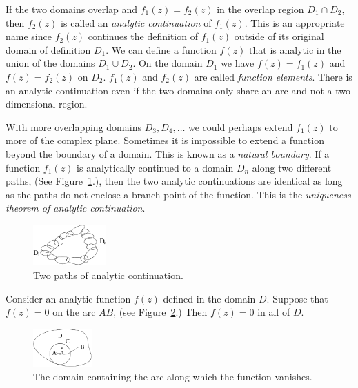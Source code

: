 If the two domains overlap and $f_1(z) = f_2(z)$ in the overlap region 
$D_1 \cap D_2$, then $f_2(z)$ is called an \textit{analytic continuation}
of $f_1(z)$.  This is an appropriate name since $f_2(z)$ continues
the definition of $f_1(z)$ outside of its original domain of definition $D_1$.
We can define a function $f(z)$ that is analytic
in the union of the domains $D_1 \cup D_2$.
On the domain $D_1$ we have $f(z) = f_1(z)$ and $f(z) = f_2(z)$ on $D_2$.
$f_1(z)$ and $f_2(z)$ are called \textit{function elements}.
There is an analytic continuation even if the two domains only share
an arc and not a two dimensional region.



With more overlapping domains $D_3, D_4, \ldots$ we could perhaps extend 
$f_1(z)$ to more of the complex plane.  Sometimes it is impossible to
extend a function beyond the boundary of a domain.  This is known
as a \textit{natural boundary}.
If a function $f_1(z)$ is analytically continued to a domain $D_n$ along two
different paths, (See Figure~\ref{twopaths}.), then the two analytic 
continuations are identical as long as the paths do not enclose a branch
point of the function.  This is the \textit{uniqueness theorem of 
  analytic continuation}.

\begin{figure}[htb!]
  \begin{center}
    \includegraphics[width=0.25\textwidth]{fcv/continuation/twopaths}
  \end{center}
  \caption{Two paths of analytic continuation.}
  \label{twopaths}
\end{figure}




Consider an analytic function $f(z)$ defined in the domain $D$.  Suppose
that $f(z) = 0$ on the arc $AB$, (see Figure~\ref{zeroarc}.)  Then
$f(z) = 0$ in all of $D$.

\begin{figure}[htb!]
  \begin{center}
    \includegraphics[width=0.2\textwidth]{fcv/continuation/zeroarc}
  \end{center}
  \caption{The domain containing the arc along which the function
    vanishes.}
  \label{zeroarc}
\end{figure}

